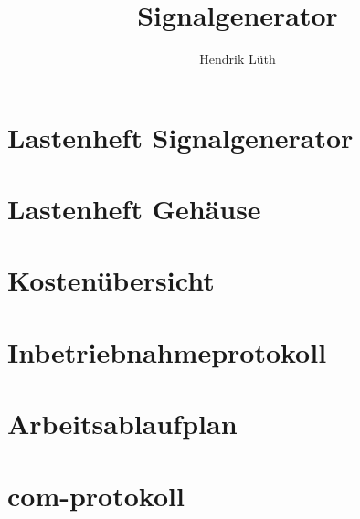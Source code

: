 \documentclass[a4paper,12pt]{book}
\title{Signalgenerator}
\author{Hendrik Lüth}
\begin{document}
\maketitle
\tableofcontents

\chapter{Lastenheft Signalgenerator}


\chapter{Lastenheft Gehäuse}


\chapter{Kostenübersicht}



\chapter{Inbetriebnahmeprotokoll}



\chapter{Arbeitsablaufplan}



\chapter{com-protokoll}

\end{document}
